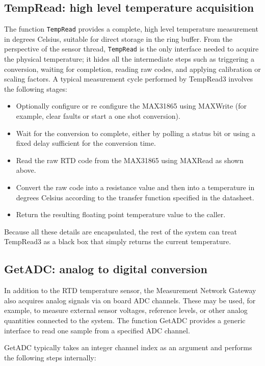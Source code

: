 \subsection{TempRead: high level temperature acquisition}
The function \texttt{TempRead} provides a complete, high level temperature measurement in degrees Celsius, suitable for direct storage in the ring buffer. From the perspective of the sensor thread, \texttt{TempRead} is the only interface needed to acquire the physical temperature; it hides all the intermediate steps such as triggering a conversion, waiting for completion, reading raw codes, and applying calibration or scaling factors.
A typical measurement cycle performed by TempRead3 involves the following stages:
\begin{itemize}
    \item Optionally configure or re configure the MAX31865 using MAXWrite (for example, clear faults or start a one shot conversion).
    \item Wait for the conversion to complete, either by polling a status bit or using a fixed delay sufficient for the conversion time.
    \item Read the raw RTD code from the MAX31865 using MAXRead as shown above.
    \item Convert the raw code into a resistance value and then into a temperature in degrees Celsius according to the transfer function specified in the datasheet.
    \item Return the resulting floating point temperature value to the caller.
\end{itemize}

Because all these details are encapsulated, the rest of the system can treat TempRead3 as a black box that simply returns the current temperature.


\subsection{GetADC: analog to digital conversion}
In addition to the RTD temperature sensor, the Measurement Network Gateway also acquires analog signals via on board ADC channels. These may be used, for example, to measure external sensor voltages, reference levels, or other analog quantities connected to the system. The function GetADC provides a generic interface to read one sample from a specified ADC channel.

GetADC typically takes an integer channel index as an argument and performs the following steps internally:

